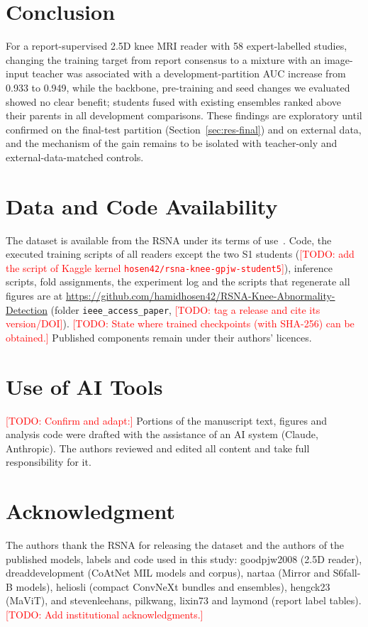 \documentclass{ieeeaccess}
\newcommand{\TODO}[1]{\textcolor{red}{[TODO: #1]}}
\begin{document}
\section{Conclusion}
\label{sec:conclusion}
For a report-supervised 2.5D knee MRI reader with 58 expert-labelled studies, changing the training target from report
consensus to a mixture with an image-input teacher was associated with a development-partition AUC increase from 0.933 to
0.949, while the backbone, pre-training and seed changes we evaluated showed no clear benefit; students fused with
existing ensembles ranked above their parents in all development comparisons. These findings are exploratory until
confirmed on the final-test partition (Section~\ref{sec:res-final}) and on external data, and the mechanism of the gain
remains to be isolated with teacher-only and external-data-matched controls.

\section*{Data and Code Availability}
The dataset is available from the RSNA under its terms of use~\cite{rsna2026knee}. Code, the executed training scripts of all
readers except the two S1 students (\TODO{add the script of Kaggle kernel \texttt{hosen42/rsna-knee-gpjw-student5}}),
inference scripts, fold assignments, the experiment log and the scripts that regenerate all figures are at
\url{https://github.com/hamidhosen42/RSNA-Knee-Abnormality-Detection} (folder \texttt{ieee\_access\_paper},
\TODO{tag a release and cite its version/DOI}). \TODO{State where trained checkpoints (with SHA-256) can be obtained.}
Published components remain under their authors' licences.

\section*{Use of AI Tools}
\TODO{Confirm and adapt:} Portions of the manuscript text, figures and analysis code were drafted with the assistance of
an AI system (Claude, Anthropic). The authors reviewed and edited all content and take full responsibility for it.

\section*{Acknowledgment}
The authors thank the RSNA for releasing the dataset and the authors of the published models, labels and code used in this
study: goodpjw2008 (2.5D reader), dreaddevelopment (CoAtNet MIL models and corpus), nartaa (Mirror and S6fall-B models),
heliosli (compact ConvNeXt bundles and ensembles), hengck23 (MaViT), and stevenleehans, pilkwang, lixin73 and laymond
(report label tables). \TODO{Add institutional acknowledgments.}
\end{document}
